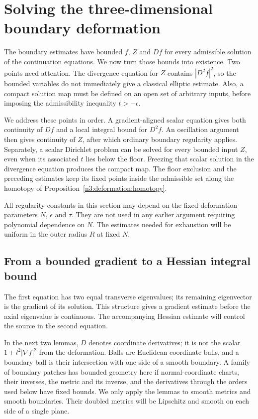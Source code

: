 \section{Solving the three-dimensional boundary deformation}
\label{n3:existence:section}

The boundary estimates have bounded $f$, $Z$ and $Df$ for every
admissible solution of the continuation equations. We now turn those
bounds into existence. Two points need attention. The divergence
equation for $Z$ contains $|D^2f|^2$, so the bounded variables do not
immediately give a classical elliptic estimate. Also, a compact
solution map must be defined on an open set of arbitrary inputs,
before imposing the admissibility inequality $t>-\epsilon$.

We address these points in order. A gradient-aligned scalar equation
gives both continuity of $Df$ and a local integral bound for $D^2f$.
An oscillation argument then gives continuity of $Z$, after which
ordinary boundary regularity applies. Separately, a scalar Dirichlet
problem can be solved for every bounded input $Z$, even when its
associated $t$ lies below the floor. Freezing that scalar solution in
the divergence equation produces the compact map. The floor exclusion
and the preceding estimates keep its fixed points inside the
admissible set along the homotopy of
Proposition~\ref{n3:deformation:homotopy}.

All regularity constants in this section may depend on the fixed
deformation parameters $N$, $\epsilon$ and $\tau$. They are not used
in any earlier argument requiring polynomial dependence on $N$.
The estimates needed for exhaustion will be uniform in the outer
radius $R$ at fixed $N$.

\subsection{From a bounded gradient to a Hessian integral bound}

The first equation has two equal transverse eigenvalues; its remaining
eigenvector is the gradient of its solution. This structure gives a
gradient estimate before the axial eigenvalue is continuous. The
accompanying Hessian estimate will control the source in the second
equation.

In the next two lemmas, $D$ denotes coordinate derivatives; it is not
the scalar $1+l^2|\nabla f|^2$ from the deformation.  Balls
are Euclidean coordinate balls, and a boundary ball is their
intersection with one side of a smooth boundary.  A family of boundary
patches has bounded geometry here if normal-coordinate charts, their
inverses, the metric and its inverse, and the derivatives through the
orders used below have fixed bounds.  We only apply the lemmas to
smooth metrics and smooth boundaries.  Their doubled metrics will be
Lipschitz and smooth on each side of a single plane.

